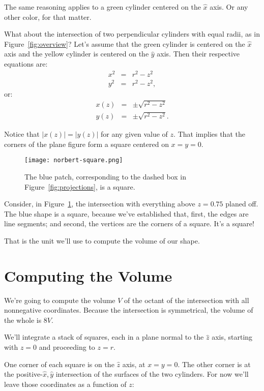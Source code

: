 \documentclass[twocolumn]{article}
\theoremstyle{definition}
\theoremstyle{plain}
\begin{document}
The same reasoning applies to a green cylinder centered on the
$\hat{x}$ axis.  Or any other color, for that matter.

What about the intersection of two perpendicular cylinders with equal
radii, as in Figure~\ref{fig:overview}?  Let's assume that the green
cylinder is centered on the $\hat{x}$ axis and the yellow cylinder is
centered on the $\hat{y}$ axis.  Then their respective equations are:
\begin{eqnarray*}
  x^2 & = & r^2 - z^2 \\
  y^2 & = & r^2 - z^2,
\end{eqnarray*}
or:
\begin{eqnarray}
  x(z) & = & \pm \sqrt{r^2 - z^2} \label{eq:x(z)} \\
  y(z) & = & \pm \sqrt{r^2 - z^2}. \label{eq:y(z)}
\end{eqnarray}

Notice that $|x(z)| = |y(z)|$ for any given value of $z$.  That implies
that the corners of the plane figure form a square centered on $x = y
= 0$.

\begin{figure}
  \texttt{[image: norbert-square.png]}
  \caption{The blue patch, corresponding to the dashed box in
    Figure~\ref{fig:projections}, is a square.}
  \label{fig:square}
\end{figure}

Consider, in Figure~\ref{fig:square}, the intersection with everything
above $z=0.75$ planed off.  The blue shape is a square, because we've
established that, first, the edges are line segments; and second, the
vertices are the corners of a square.  It's a square!

That is the unit we'll use to compute the volume of our shape.

\section{Computing the Volume}
\label{sec:computing}

We're going to compute the volume $V$ of the octant of the
intersection with all nonnegative coordinates.  Because the
intersection is symmetrical, the volume of the whole is $8V$.

We'll integrate a stack of squares, each in a plane normal to the
$\hat{z}$ axis, starting with $z=0$ and proceeding to $z=r$.

One corner of each square is on the $\hat{z}$ axis, at $x=y=0$.  The
other corner is at the positive-$\hat{x},\hat{y}$ intersection of the
surfaces of the two cylinders.  For now we'll leave those coordinates
as a function of $z$:
\end{document}
